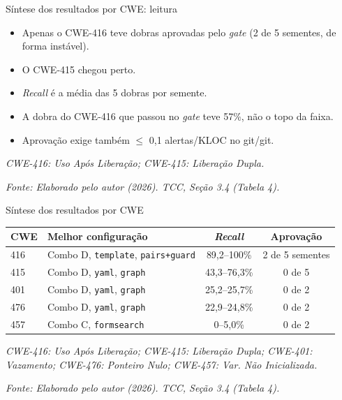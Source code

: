 \documentclass[
    aspectratio=169,
    12pt,
    brazil
]{beamer}
\newcommand{\fonte}[1]{{\tiny\itshape Fonte: #1\par}}
\begin{document}
\begin{frame}{Síntese dos resultados por CWE: leitura}
  \begin{itemize}
    \item Apenas o CWE-416 teve dobras aprovadas pelo \textit{gate} (2 de 5 sementes, de forma instável).
    \item O CWE-415 chegou perto.
    \item \textit{Recall} é a média das 5 dobras por semente.
    \item A dobra do CWE-416 que passou no \textit{gate} teve 57\%, não o topo da faixa.
    \item Aprovação exige também $\leq$ 0,1 alertas/KLOC no git/git.
  \end{itemize}
  \vfill
  {\tiny\itshape CWE-416: Uso Após Liberação; CWE-415: Liberação Dupla.\par}
  \fonte{Elaborado pelo autor (2026). TCC, Seção 3.4 (Tabela 4).}
\end{frame}

\begin{frame}{Síntese dos resultados por CWE}
  \begin{table}
  \normalsize
  \begin{tabular}{lp{5.2cm}cc}
  \toprule
  \textbf{CWE} & \textbf{Melhor configuração} & \textbf{\textit{Recall}} & \textbf{Aprovação} \\
  \midrule
  416 & Combo D, \texttt{template}, \texttt{pairs+guard} & 89,2--100\% & 2 de 5 sementes \\
  415 & Combo D, \texttt{yaml}, \texttt{graph} & 43,3--76,3\% & 0 de 5 \\
  401 & Combo D, \texttt{yaml}, \texttt{graph} & 25,2--25,7\% & 0 de 2 \\
  476 & Combo D, \texttt{yaml}, \texttt{graph} & 22,9--24,8\% & 0 de 2 \\
  457 & Combo C, \texttt{formsearch} & 0--5,0\% & 0 de 2 \\
  \bottomrule
  \end{tabular}
  \end{table}
  \vfill
  {\tiny\itshape CWE-416: Uso Após Liberação; CWE-415: Liberação Dupla; CWE-401: Vazamento; CWE-476: Ponteiro Nulo; CWE-457: Var. Não Inicializada.\par}
  \fonte{Elaborado pelo autor (2026). TCC, Seção 3.4 (Tabela 4).}
\end{frame}
\end{document}
